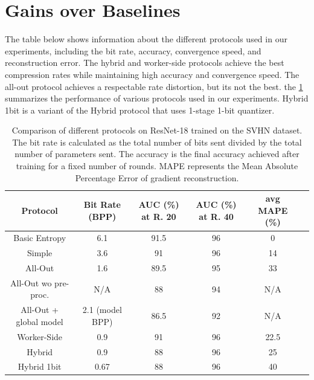 \section{Gains over Baselines}
The table below shows information about the different protocols used in our experiments, including the bit rate, accuracy, convergence speed, and reconstruction error. The hybrid and worker-side protocols achieve the best compression rates while maintaining high accuracy and convergence speed. The all-out protocol achieves a respectable rate distortion, but its not the best. the \ref{tab:protocol_comparison} summarizes the performance of various protocols used in our experiments. Hybrid 1bit is a variant of the Hybrid protocol that uses 1-stage 1-bit quantizer.

\begin{table}[H]
    \centering
    \begin{tabular}{|c|c|c|c|c|c|}
        \hline
        Protocol & Bit Rate (BPP) & AUC (\%) at R. 20 & AUC (\%) at R. 40 & avg MAPE (\%) \\
        \hline
        Basic Entropy & 6.1 & 91.5 & 96 & 0 \\
        \hline
        Simple & 3.6 & 91 & 96 & 14 \\
        \hline
        All-Out & 1.6 & 89.5 & 95 & 33 \\
        \hline
        All-Out wo pre-proc. & N/A & 88 & 94 & N/A \\
        \hline
        All-Out + global model & 2.1 (model BPP) & 86.5 & 92 & N/A \\
        \hline
        Worker-Side & 0.9 & 91 & 96 & 22.5 \\
        \hline
        Hybrid & 0.9 & 88 & 96 & 25 \\
        \hline
        Hybrid 1bit & 0.67 & 88 & 96 & 40 \\
        \hline
    \end{tabular}
    \caption{Comparison of different protocols on ResNet-18 trained on the SVHN dataset. The bit rate is calculated as the total number of bits sent divided by the total number of parameters sent. The accuracy is the final accuracy achieved after training for a fixed number of rounds. MAPE represents the Mean Absolute Percentage Error of gradient reconstruction.}
    \label{tab:protocol_comparison}
\end{table}

